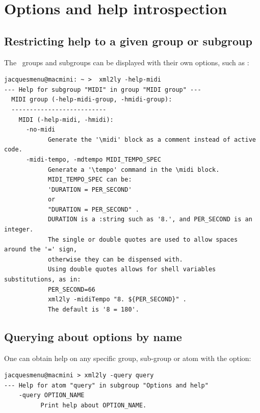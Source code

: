 \chapter{Options and help introspection}

\section{Restricting help to a given group or subgroup}

The \oahRepr\ groups and subgroups can be displayed with their own options, such as :
\begin{lstlisting}[language=Terminal]
jacquesmenu@macmini: ~ >  xml2ly -help-midi
--- Help for subgroup "MIDI" in group "MIDI group" ---
  MIDI group (-help-midi-group, -hmidi-group):
  --------------------------
    MIDI (-help-midi, -hmidi):
      -no-midi
            Generate the '\midi' block as a comment instead of active code.
      -midi-tempo, -mdtempo MIDI_TEMPO_SPEC
            Generate a '\tempo' command in the \midi block.
            MIDI_TEMPO_SPEC can be:
            'DURATION = PER_SECOND'
            or
            "DURATION = PER_SECOND" .
            DURATION is a :string such as '8.', and PER_SECOND is an integer.
            The single or double quotes are used to allow spaces around the '=' sign,
            otherwise they can be dispensed with.
            Using double quotes allows for shell variables substitutions, as in:
            PER_SECOND=66
            xml2ly -midiTempo "8. ${PER_SECOND}" .
            The default is '8 = 180'.
\end{lstlisting}


\section{Querying about options by name}\label{Querying about options by name}

One can obtain help on any specific group, sub-group or atom with the  option:
\begin{lstlisting}[language=Terminal]
jacquesmenu@macmini > xml2ly -query query
--- Help for atom "query" in subgroup "Options and help"
    -query OPTION_NAME
          Print help about OPTION_NAME.
\end{lstlisting}


